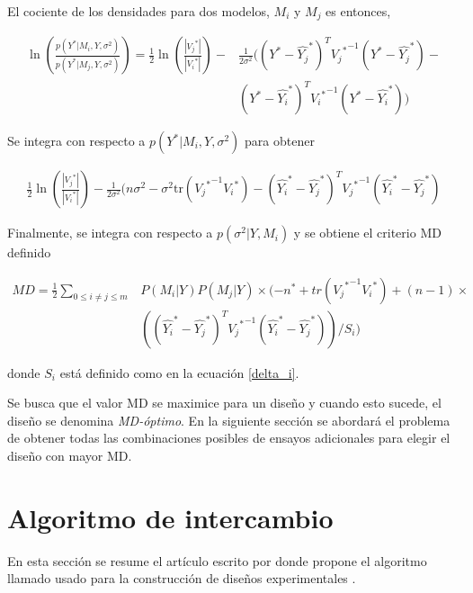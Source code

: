 \noindent El cociente de los densidades para dos modelos, $M_i$ y $M_j$ es entonces, 

\begin{equation*}
	\begin{aligned}
		\ln \left (\frac{p(Y^{*} | M_i, Y, \sigma^{2})}{p(Y^{*}| M_j, Y, \sigma^{2})} \right ) =  \frac{1}{2} \ln \left (\frac{|{V_j}^{*}|}{|{V_i}^{*}|} \right ) - &
		 \frac{1}{2 \sigma^{2}} ((Y^{*} - \hat{{Y_j}}^{*})^{T} {{V_j}^{*}}^{-1}(Y^{*} - \hat{{Y_j}}^{*}) - \\
		 & (Y^{*} - \hat{{Y_i}}^{*})^{T}{{V_i}^{*}}^{-1}(Y^{*} - \hat{{Y_i}}^{*}))
	\end{aligned}
\end{equation*}

Se integra con respecto a $p(Y^{*} | M_i, Y, \sigma^{2})$ para obtener

\begin{equation*}
	\begin{aligned}
		\frac{1}{2} \ln(\frac{|{V_j}^{*}|}{|{V_i}^{*}|}) - \frac{1}{2 \sigma^{2}}(n\sigma^{2} - \sigma^{2}\text{tr}({{V_j}^{*}}^{-1}{V_i}^{*}) - (\hat{{Y_i}}^{*} - \hat{{Y_j}}^{*})^{T}{{V_j}^{*}}^{-1}(\hat{{Y_i}}^{*} - \hat{{Y_j}}^{*})
	\end{aligned}
\end{equation*}

Finalmente, se integra con respecto a $p(\sigma^{2} | Y, M_i)$ y se obtiene el criterio MD definido 

\begin{equation} \label{formula_MD}
	\begin{aligned}
		MD =  \frac{1}{2} \sum_{0 \leq i \neq j \leq m} & P(M_i | Y)  P(M_j | Y) \times  (-n^{*} + tr({{V_j}^{*}}^{-1}{V_i}^{*}) + (n-1) \times \\
		& ((\hat{{Y_i}}^{*}-\hat{{Y_j}}^{*})^{T}{{V_j}^{*}}^{-1}(\hat{{Y_i}}^{*} - \hat{{Y_j}}^{*}))/S_i)
	\end{aligned}
\end{equation}

\noindent donde $S_i$ está definido como en la ecuación \ref{delta_i}. 

Se busca que el valor MD se maximice para un diseño y cuando esto sucede, el diseño se denomina \textit{MD-óptimo}. En la siguiente sección se abordará el problema de obtener todas las combinaciones posibles de ensayos adicionales para elegir el diseño con mayor MD. 


\section{Algoritmo de intercambio} \label{sec_algInterca}
En esta sección se resume el artículo escrito por \cite{mitchelldetmax} donde propone el algoritmo llamado  usado para la construcción de diseños experimentales . 

